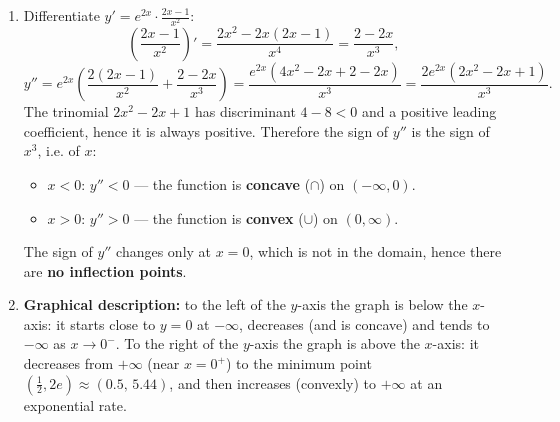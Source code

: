 \begin{solution}
\begin{enumerate}
  \item Differentiate $y'=e^{2x}\cdot\frac{2x-1}{x^2}$:
  \[ \left(\frac{2x-1}{x^2}\right)'=\frac{2x^2-2x(2x-1)}{x^4}=\frac{2-2x}{x^3}, \]
  \[ y''=e^{2x}\left(\frac{2(2x-1)}{x^2}+\frac{2-2x}{x^3}\right)=\frac{e^{2x}\left(4x^2-2x+2-2x\right)}{x^3}=\frac{2e^{2x}\left(2x^2-2x+1\right)}{x^3}. \]
  The trinomial $2x^2-2x+1$ has discriminant $4-8<0$ and a positive leading coefficient, hence it is always positive. Therefore the sign of $y''$ is the sign of $x^3$, i.e. of $x$:
  \begin{itemize}
    \item $x<0$: $y''<0$ --- the function is \textbf{concave} ($\cap$) on $(-\infty,0)$.
    \item $x>0$: $y''>0$ --- the function is \textbf{convex} ($\cup$) on $(0,\infty)$.
  \end{itemize}
  The sign of $y''$ changes only at $x=0$, which is not in the domain, hence there are \textbf{no inflection points}.

  \item \textbf{Graphical description:} to the left of the $y$-axis the graph is below the $x$-axis: it starts close to $y=0$ at $-\infty$, decreases (and is concave) and tends to $-\infty$ as $x\to0^-$. To the right of the $y$-axis the graph is above the $x$-axis: it decreases from $+\infty$ (near $x=0^+$) to the minimum point $(\frac12,2e)\approx(0.5,\,5.44)$, and then increases (convexly) to $+\infty$ at an exponential rate.
\end{enumerate}
\end{solution}
